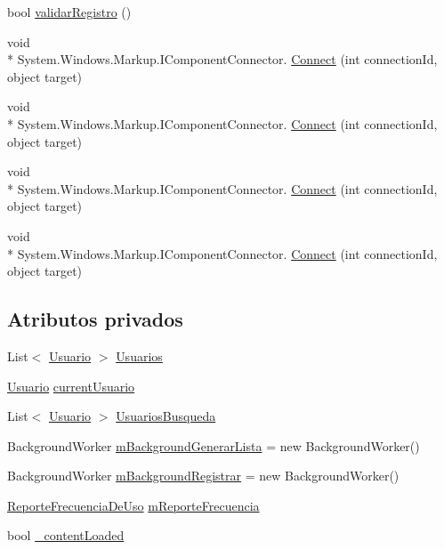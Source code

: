 \begin{DoxyCompactItemize}
bool \hyperlink{class_proyecto___integrador__3_1_1_main_window_a8710779e7a7c19e36d1c910e47fce573}{validar\-Registro} ()
\item 
void \\*
System.\-Windows.\-Markup.\-I\-Component\-Connector. \hyperlink{class_proyecto___integrador__3_1_1_main_window_a4b924975ba45d78542912ddd7d49152b}{Connect} (int connection\-Id, object target)
\item 
void \\*
System.\-Windows.\-Markup.\-I\-Component\-Connector. \hyperlink{class_proyecto___integrador__3_1_1_main_window_a4b924975ba45d78542912ddd7d49152b}{Connect} (int connection\-Id, object target)
\item 
void \\*
System.\-Windows.\-Markup.\-I\-Component\-Connector. \hyperlink{class_proyecto___integrador__3_1_1_main_window_a4b924975ba45d78542912ddd7d49152b}{Connect} (int connection\-Id, object target)
\item 
void \\*
System.\-Windows.\-Markup.\-I\-Component\-Connector. \hyperlink{class_proyecto___integrador__3_1_1_main_window_a4b924975ba45d78542912ddd7d49152b}{Connect} (int connection\-Id, object target)
\end{DoxyCompactItemize}
\subsection*{Atributos privados}
\begin{DoxyCompactItemize}
\item 
List$<$ \hyperlink{class_proyecto___integrador__3_1_1_tipos_dato_1_1_usuario}{Usuario} $>$ \hyperlink{class_proyecto___integrador__3_1_1_main_window_aa96755d8e5d995f2a6fcc75568ad5b4d}{Usuarios}
\item 
\hyperlink{class_proyecto___integrador__3_1_1_tipos_dato_1_1_usuario}{Usuario} \hyperlink{class_proyecto___integrador__3_1_1_main_window_a14c72c878b871a5918157f933a638a6e}{current\-Usuario}
\item 
List$<$ \hyperlink{class_proyecto___integrador__3_1_1_tipos_dato_1_1_usuario}{Usuario} $>$ \hyperlink{class_proyecto___integrador__3_1_1_main_window_af1075eadedcbd62d11bd043542ea94de}{Usuarios\-Busqueda}
\item 
Background\-Worker \hyperlink{class_proyecto___integrador__3_1_1_main_window_a8c7bc6dfcff68ff1ad690fead87313b0}{m\-Background\-Generar\-Lista} = new Background\-Worker()
\item 
Background\-Worker \hyperlink{class_proyecto___integrador__3_1_1_main_window_aabcce21ca35108e6a3ab08f14883cdf2}{m\-Background\-Registrar} = new Background\-Worker()
\item 
\hyperlink{class_proyecto___integrador__3_1_1_reportes_1_1_reporte_frecuencia_de_uso}{Reporte\-Frecuencia\-De\-Uso} \hyperlink{class_proyecto___integrador__3_1_1_main_window_a6543f720f5d77939f0cc967765351416}{m\-Reporte\-Frecuencia}
\item 
bool \hyperlink{class_proyecto___integrador__3_1_1_main_window_a84896113b6d4ef07f781286dd244db94}{\-\_\-content\-Loaded}
\end{DoxyCompactItemize}
